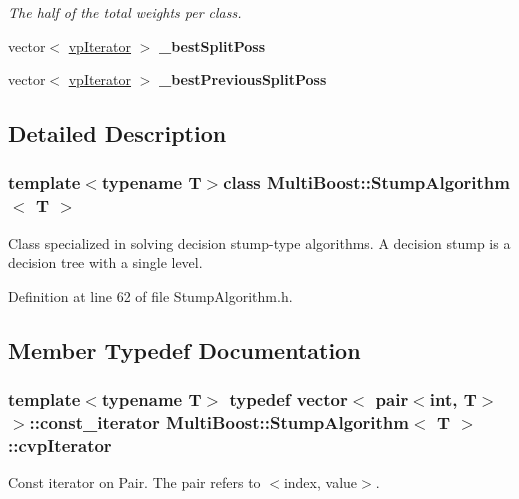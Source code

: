 \begin{DoxyCompactItemize}
\begin{DoxyCompactList}\small\item\em The half of the total weights per class. \end{DoxyCompactList}\item 
\hypertarget{classMultiBoost_1_1StumpAlgorithm_ad6648537da8d39da5079619cc7cacd72}{vector$<$ \hyperlink{classMultiBoost_1_1StumpAlgorithm_a358eae7c8636c09b6b26ef0cc74bbd51}{vp\-Iterator} $>$ {\bfseries \-\_\-best\-Split\-Poss}}\label{classMultiBoost_1_1StumpAlgorithm_ad6648537da8d39da5079619cc7cacd72}

\item 
\hypertarget{classMultiBoost_1_1StumpAlgorithm_af38ce488164c204bda0a51bcd989637c}{vector$<$ \hyperlink{classMultiBoost_1_1StumpAlgorithm_a358eae7c8636c09b6b26ef0cc74bbd51}{vp\-Iterator} $>$ {\bfseries \-\_\-best\-Previous\-Split\-Poss}}\label{classMultiBoost_1_1StumpAlgorithm_af38ce488164c204bda0a51bcd989637c}

\end{DoxyCompactItemize}


\subsection{Detailed Description}
\subsubsection*{template$<$typename T$>$class Multi\-Boost\-::\-Stump\-Algorithm$<$ T $>$}

Class specialized in solving decision stump-\/type algorithms. A decision stump is a decision tree with a single level. 

Definition at line 62 of file Stump\-Algorithm.\-h.



\subsection{Member Typedef Documentation}
\hypertarget{classMultiBoost_1_1StumpAlgorithm_a0bb544acc46504f3f80a71a58a3ef75a}{
\subsubsection[{cvp\-Iterator}]{\setlength{\rightskip}{0pt plus 5cm}template$<$typename T$>$ typedef vector$<$ pair$<$int, T$>$ $>$\-::const\-\_\-iterator {\bf Multi\-Boost\-::\-Stump\-Algorithm}$<$ T $>$\-::{\bf cvp\-Iterator}}}\label{classMultiBoost_1_1StumpAlgorithm_a0bb544acc46504f3f80a71a58a3ef75a}
Const iterator on Pair. The pair refers to $<$index, value$>$. 


